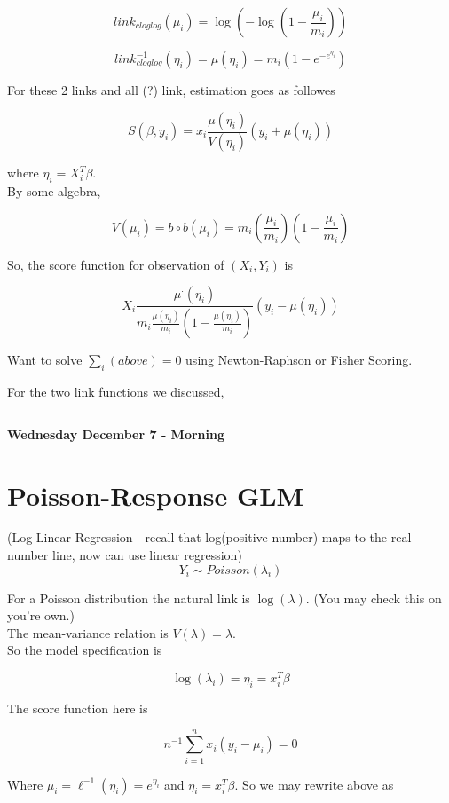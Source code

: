 \documentclass[11pt,fleqn]{book} %
\begin{document}
		$$link_{cloglog} (\mu_i) = \log( -\log(1 - \frac{\mu_i}{m_i})) $$

		$$link_{cloglog}^{-1}(\eta_i) =  \mu(\eta_i) = m_i (1 - e^{-e^{\eta_i}}) $$

For these 2 links and all (?) link, estimation goes as followes

		$$S(\beta, y_i) = x_i \frac{\mu(\eta_i)}{V(\eta_i)}(y_i + \mu(\eta_i)) $$

where $\eta_i = X_i^T \beta$.\\

By some algebra, 

		$$V(\mu_i) = b \circ b(\mu_i) = m_i (\frac{\mu_i}{m_i})(1 - \frac{\mu_i}{m_i}) $$

So, the score function for observation of $(X_i, Y_i)$ is

		$$ X_i \frac{\mu^\cdot(\eta_i)}{m_i \frac{\mu(\eta_i)}{m_i} (1 - \frac{\mu(\eta_i)}{m_i})} (y_i - \mu(\eta_i)) $$

Want to solve $\sum_i (above) = 0$ using Newton-Raphson or Fisher Scoring. 

For the two link functions we discussed, 

		$$ $$

\textbf{Wednesday December 7 - Morning}\\


\section{Poisson-Response GLM}

(Log Linear Regression - recall that log(positive number) maps to the real number line, now can use linear regression)\\



		$$Y_i \sim Poisson(\lambda_i) $$

For a Poisson distribution the natural link is $\log(\lambda)$. (You may check this on you're own.)\\

The mean-variance relation is $V(\lambda) = \lambda$.\\

So the model specification is 

		$$\log(\lambda_i) = \eta_i = x_i^T \beta $$

The score function here is 
		
		$$n^{-1} \sum_{i=1}^n x_i(y_i - \mu_i) = 0 $$

Where $\mu_i = \ell^{-1}(\eta_i) = e^{\eta_i}$ and $\eta_i = x_i^T \beta$. So we may rewrite above as 
\end{document}
